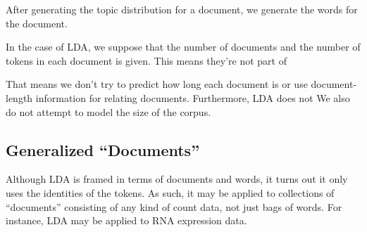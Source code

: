 After generating the topic distribution for a document, we generate
the words for the document.  

In the case of LDA, we suppose that the number of documents and the
number of tokens in each document is given.  This means they're
not part of 

That means we don't try
to predict how long each document is or use document-length
information for relating documents.  Furthermore, LDA does not We also do not attempt to model
the size of the corpus.


\subsection{Generalized ``Documents''}

Although LDA is framed in terms of documents and words, it turns out
it only uses the identities of the tokens.  As such, it may be applied
to collections of ``documents'' consisting of any kind of count data,
not just bags of words.  For instance, LDA may be applied to RNA
expression data.

